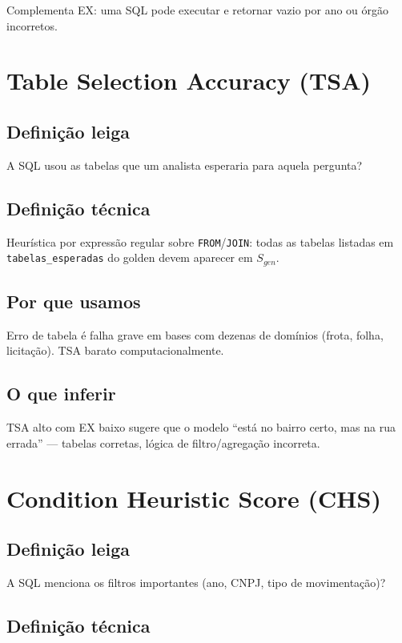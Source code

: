Complementa EX: uma SQL pode executar e retornar vazio por ano ou órgão incorretos.

\section{Table Selection Accuracy (TSA)}

\subsection{Definição leiga}

A SQL usou as tabelas que um analista esperaria para aquela pergunta?

\subsection{Definição técnica}

Heurística por expressão regular sobre \texttt{FROM}/\texttt{JOIN}: todas as tabelas listadas em \texttt{tabelas\_esperadas} do golden devem aparecer em $S_{gen}$.

\subsection{Por que usamos}

Erro de tabela é falha grave em bases com dezenas de domínios (frota, folha, licitação). TSA barato computacionalmente.

\subsection{O que inferir}

TSA alto com EX baixo sugere que o modelo ``está no bairro certo, mas na rua errada'' --- tabelas corretas, lógica de filtro/agregação incorreta.

\section{Condition Heuristic Score (CHS)}

\subsection{Definição leiga}

A SQL menciona os filtros importantes (ano, CNPJ, tipo de movimentação)?

\subsection{Definição técnica}


